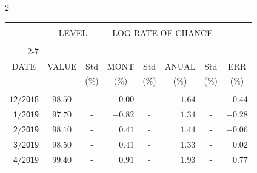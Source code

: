 \begin{multicols}{2}{ 
\begin{tabular}{rccrcrcr} 
\hline 
 \multicolumn{1}{|c|}{}  &  \multicolumn{2}{c|}{} & 
\multicolumn{4}{c}{} & \multicolumn{1}{|c|}{}\vspace{-.10in}\\ 
\multicolumn{1}{|c|}{}  &  \multicolumn{2}{c|}{LEVEL} & 
\multicolumn{4}{c}{LOG RATE OF CHANCE} & \multicolumn{1}{|c|}{}    \\  
\multicolumn{1}{|c|}{}  &  \multicolumn{2}{c|}{} & 
\multicolumn{4}{c}{} & \multicolumn{1}{|c|}{}\vspace{-.10in}\\ \cline{2-7} 
\multicolumn{1}{|c|}{ } &\multicolumn{1}{c|}{ } & \multicolumn{1}{c|}{} & \multicolumn{1}{c|}{} & \multicolumn{1}{c|}{}     & \multicolumn{1}{c|}{} & \multicolumn{1}{c|}{}  & \multicolumn{1}{c|}{}  \vspace{-.05in}\\  
\multicolumn{1}{|c|}{DATE } &\multicolumn{1}{c|}{ VALUE} & \multicolumn{1}{c|}{Std} & \multicolumn{1}{c|}{MONT} & \multicolumn{1}{c|}{Std}     & \multicolumn{1}{c|}{ANUAL} & \multicolumn{1}{c|}{Std}  & \multicolumn{1}{c|}{ERR}\\  
\multicolumn{1}{|c|}{ }      & \multicolumn{1}{c|}{  }    & \multicolumn{1}{c|}{($\%$)}&  \multicolumn{1}{c|}{($\%$)  }  & \multicolumn{1}{c|}{($\%$)} & \multicolumn{1}{c|}{($\%$) }     & \multicolumn{1}{c|}{ ($\%$) }  &  \multicolumn{1}{c|}{ ($\%$) } \\  
 \hline 
 \\$\mathsf{      12/2018}$ &$\mathsf{    98.50}$ &     - &$\mathsf{    0.00}$ &     - &$\mathsf{     1.64 }$ &     - &$\mathsf{  -0.44} $ \vspace{-.005in}\\ 
$\mathsf{       1/2019}$ &$\mathsf{    97.70}$ &     - &$\mathsf{   -0.82}$ &     - &$\mathsf{     1.34 }$ &     - &$\mathsf{  -0.28} $ \vspace{-.005in}\\ 
$\mathsf{       2/2019}$ &$\mathsf{    98.10}$ &     - &$\mathsf{    0.41}$ &     - &$\mathsf{     1.44 }$ &     - &$\mathsf{  -0.06} $ \vspace{-.005in}\\ 
$\mathsf{       3/2019}$ &$\mathsf{    98.50}$ &     - &$\mathsf{    0.41}$ &     - &$\mathsf{     1.33 }$ &     - &$\mathsf{   0.02} $ \vspace{-.005in}\\ 
$\mathsf{       4/2019}$ &$\mathsf{    99.40}$ &     - &$\mathsf{    0.91}$ &     - &$\mathsf{     1.93 }$ &     - &$\mathsf{   0.77} $ \vspace{-.005in}\\ 

\end{tabular}}
\end{multicols}
